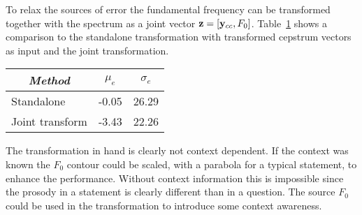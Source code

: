 To relax the sources of error the fundamental frequency can be transformed together with the spectrum as a joint vector $\mathbf{z} = \left[\mathbf{y}_{cc},F_0\right]$. Table~\ref{tab:f0_joint_transform} shows a comparison to the standalone transformation with transformed cepstrum vectors as input and the joint transformation.
\begin{table}[htbp]
	\begin{center}
		\label{tab:f0_joint_transform}
		\begin{tabular}{lll}
			\toprule
			\multicolumn{1}{c}{\emph{Method}} & \multicolumn{1}{c}{\emph{$\mu_e$}} & \multicolumn{1}{c}{\emph{$\sigma_e$}}\\
			\midrule
			Standalone & -0.05 & 26.29 \\
			Joint transform & -3.43 & 22.26 \\
			\bottomrule			
		\end{tabular}		
	\end{center}	
\end{table}

The transformation in hand is clearly not context dependent. If the context was known the $F_0$ contour could be scaled, with \eg a parabola for a typical statement, to enhance the performance. Without context information this is impossible since the prosody in a statement is clearly different than in a question. The source $F_0$ could be used in the transformation to introduce some context awareness.

